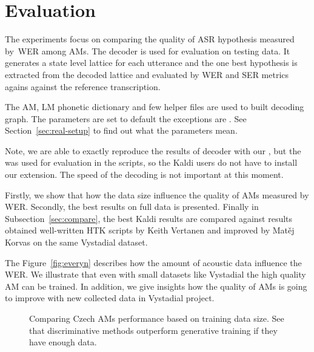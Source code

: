 \section{Evaluation}
\label{sec:am_eval}

The experiments focus on comparing the quality of ASR hypothesis measured by~\ac{WER} among \acp{AM}.
The  decoder is used for evaluation on testing data.
It generates a state level lattice for each utterance and the one best hypothesis is extracted from the decoded lattice and evaluated by \ac{WER} and \ac{SER} metrics agains against the reference transcription.

The \ac{AM}, \ac{LM} phonetic dictionary and few helper files are used to built  decoding graph.
The parameters are set to default the exceptions are . See Section~\ref{sec:real-setup} to find out what the parameters mean.

Note, we are able to exactly reproduce the results of  decoder with our , but the  was used for evaluation in the scripts, so the Kaldi users do not have to install our extension.
The speed of the decoding is not important at this moment. 

Firstly, we show that how the data size influence the quality of \acp{AM} measured by \ac{WER}.
Secondly,  the best results on full data is presented.
Finally in Subsection~\ref{sec:compare}, the best Kaldi results are compared against results obtained well-written \ac{HTK} scripts by Keith Vertanen and improved by Matěj Korvas \cite{korvas_2014} on the same Vystadial dataset.


The Figure~\ref{fig:everyn} describes how the amount of acoustic data influence the \ac{WER}.
We illustrate that even with small datasets like Vystadial the high quality \ac{AM} can be trained.
In addition, we give insights how the quality of \acp{AM} is going to improve with new collected data in Vystadial project.

\begin{figure}[!htp]
    \begin{center}
    \end{center}
    \caption{Comparing Czech \acp{AM} performance  based on training data size. See that discriminative methods outperform generative training if they have enough data.}
    \label{fig:am-deps} 
\end{figure}



